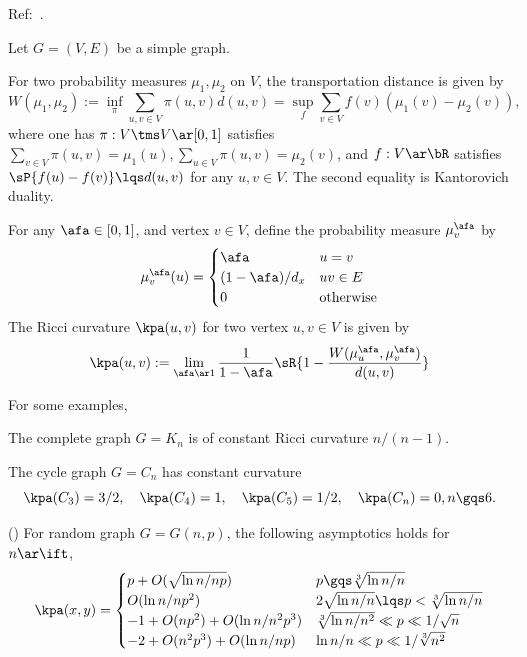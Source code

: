 \documentclass[a4paper, twoside]{article}
\begin{document}

Ref:~\cite{LLY2011}.

\begin{stp}
	Let $G=(V,E)$ be a simple graph.
\end{stp}

\begin{dfn}
	For two probability measures $\mu_{1},\mu_{2}$ on $V$, the transportation distance is given by
	\[
		W(\mu_{1},\mu_{2}):=\inf_{\pi}\sum_{u,v\in V}\pi(u,v)d(u,v)=\sup_{f}\sum_{v\in V}f(v)(\mu_{1}(v)-\mu_{2}(v)),
	\]
	where one has $\pi:V\tms V\ar[0,1]$ satisfies $\sum_{v\in V}\pi(u,v)=\mu_{1}(u),\sum_{u\in V}\pi(u,v)=\mu_{2}(v)$, and $f:V\ar\bR$ satisfies $\sP{f(u)-f(v)}\lqs d(u,v)$ for any $u,v\in V$. The second equality is Kantorovich duality.
\end{dfn}

\begin{dfn}
	For any $\afa\in[0,1]$, and vertex $v\in V$, define the probability measure $\mu_{v}^{\afa}$ by
	\[
		\mu_{v}^{\afa}(u)=\begin{cases}
		  \afa & u=v \\
		  (1-\afa)/d_{x} & uv\in E \\
		  0 & $otherwise$
		\end{cases}
	\]
	The Ricci curvature $\kpa(u,v)$ for two vertex $u,v\in V$ is given by
	\[
		\kpa(u,v):=\lim_{\afa\ar1}\frac{1}{1-\afa}\sR{1-\frac{W(\mu_{u}^{\afa}, \mu_{v}^{\afa})}{d(u,v)}}
	\]
\end{dfn}

\begin{exg}
	For some examples,
	\begin{enr}[label=(\arabic*)]
		\item The complete graph $G=K_{n}$ is of constant Ricci curvature $n/(n-1)$.
		\item The cycle graph $G=C_{n}$ has constant curvature
		\[
			\kpa(C_{3})=3/2,\quad \kpa(C_{4})=1,\quad \kpa(C_{5})=1/2,\quad \kpa(C_{n})=0,n\gqs6.
		\]
		\item (\cite[Theorem~5.1]{LLY2011}) For random graph $G=G(n,p)$, the following asymptotics holds for $n\ar\ift$,
		\[
			\kpa(x,y)=\begin{cases}
			  p+O(\sqrt{\ln{n}/np}) & p\gqs\sqrt[3]{\ln{n}/n} \\
			  O(\ln{n}/np^{2}) & 2\sqrt{\ln{n}/n}\lqs p<\sqrt[3]{\ln{n}/n} \\
			  -1+O(np^{2})+O(\ln{n}/n^{2}p^{3}) & \sqrt[3]{\ln{n}/n^{2}}\ll p\ll 1/\sqrt{n} \\
			  -2+O(n^{2}p^{3})+O(\ln{n}/np) & \ln{n}/n\ll p\ll 1/\sqrt[3]{n^{2}}
			\end{cases}
		\]
	\end{enr}
\end{exg}


\printref
\end{document}
